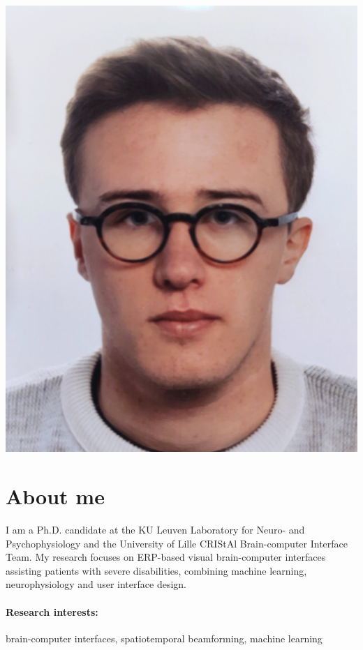 \documentclass[10pt,a4paper]{article}
\begin{document}
    \begin{minipage}{.25\linewidth}
        \includegraphics[width=\linewidth]{photo.jpg}
    \end{minipage}


    \section*{About me}

    I am a Ph.D. candidate at the KU Leuven Laboratory for Neuro- and Psychophysiology and the University of Lille
    CRIStAl Brain-computer Interface Team.
    My research focuses on ERP-based visual brain-computer interfaces assisting patients with severe disabilities,
    combining machine learning, neurophysiology and user interface design.

    \paragraph{Research interests:} brain-computer interfaces, spatiotemporal beamforming, machine learning
\end{document}
